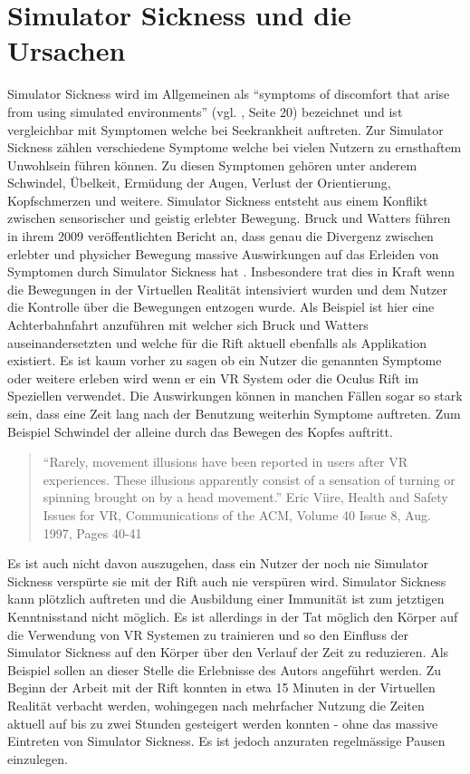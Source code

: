 \documentclass[pagesize, paper=a4, fontsize=12pt,titlepage=true, headings=small, headnosepline, abstractoff, liststotoc, nochapterprefix, plainheadsepline, twoside]{scrreprt}
\begin{document}
\section{Simulator Sickness und die Ursachen}
Simulator Sickness wird im Allgemeinen als "`symptoms of discomfort that arise from using simulated environments"' (vgl. \cite{OculusVR2014}, Seite 20) bezeichnet und ist vergleichbar mit Symptomen welche bei Seekrankheit auftreten.
Zur Simulator Sickness zählen verschiedene Symptome welche bei vielen Nutzern zu ernsthaftem Unwohlsein führen können. Zu diesen Symptomen gehören unter anderem Schwindel, Übelkeit, Ermüdung der Augen, Verlust der Orientierung, Kopfschmerzen und weitere. Simulator Sickness entsteht aus einem Konflikt zwischen sensorischer und geistig erlebter Bewegung. Bruck und Watters führen in ihrem 2009 veröffentlichten Bericht an, dass genau die Divergenz zwischen erlebter und physicher Bewegung massive Auswirkungen auf das Erleiden von Symptomen durch Simulator Sickness hat \cite{BruckWatters2009}. Insbesondere trat dies in Kraft wenn die Bewegungen in der Virtuellen Realität intensiviert wurden und dem Nutzer die Kontrolle über die Bewegungen entzogen wurde. Als Beispiel ist hier eine Achterbahnfahrt anzuführen mit welcher sich Bruck und Watters auseinandersetzten und welche für die Rift aktuell ebenfalls als  Applikation existiert. Es ist kaum vorher zu sagen ob ein Nutzer die genannten Symptome oder weitere erleben wird wenn er ein VR System oder die Oculus Rift im Speziellen verwendet. Die Auswirkungen können in manchen Fällen sogar so stark sein, dass eine Zeit lang nach der Benutzung weiterhin Symptome auftreten. Zum Beispiel Schwindel der alleine durch das Bewegen des Kopfes auftritt.
\begin{quote}
"`Rarely, movement illusions have been reported in users after VR experiences. These illusions apparently consist of a sensation of turning or spinning brought on by a head movement."' Eric Viire, Health and Safety Issues for VR, Communications of the ACM, Volume 40 Issue 8, Aug. 1997, Pages 40-41 
\cite{Viire:1997:HSI:257874.257882}
\end{quote}


Es ist auch nicht davon auszugehen, dass ein Nutzer der noch nie Simulator Sickness verspürte sie mit der Rift auch nie verspüren wird. Simulator Sickness kann plötzlich auftreten und die Ausbildung einer Immunität ist zum jetztigen Kenntnisstand nicht möglich. Es ist allerdings in der Tat möglich den Körper auf die Verwendung von VR Systemen zu trainieren und so den Einfluss der Simulator Sickness auf den Körper über den Verlauf der Zeit zu reduzieren. Als Beispiel sollen an dieser Stelle die Erlebnisse des Autors angeführt werden. Zu Beginn der Arbeit mit der Rift konnten in etwa 15 Minuten in der Virtuellen Realität verbacht werden, wohingegen nach mehrfacher Nutzung die Zeiten aktuell auf bis zu zwei Stunden gesteigert werden konnten - ohne das massive  Eintreten von Simulator Sickness. Es ist jedoch anzuraten regelmässige Pausen einzulegen.
\end{document}
